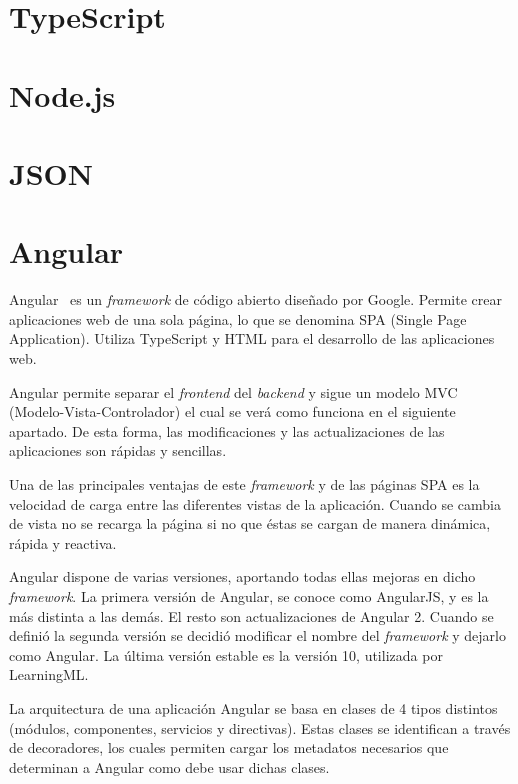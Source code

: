\documentclass[a4paper, 12pt]{book}
\begin{document}
\section{TypeScript} 
\label{sec:typescript}

\section{Node.js} 
\label{sec:nodejs}

\section{JSON} 
\label{sec:json}

\section{Angular} 
\label{sec:angular}

Angular~\cite{angular} es un \emph{framework} de código abierto diseñado por Google. Permite crear aplicaciones web de una sola página, lo que se denomina SPA (Single Page Application). Utiliza TypeScript y HTML para el desarrollo de las aplicaciones web. 

Angular permite separar el \emph{frontend} del \emph{backend} y sigue un modelo MVC (Modelo-Vista-Controlador) el cual se verá como funciona en el siguiente apartado. De esta forma, las modificaciones y las actualizaciones de las aplicaciones son rápidas y sencillas. 

Una de las principales ventajas de este \emph{framework} y de las páginas SPA es la velocidad de carga entre las diferentes vistas de la aplicación. Cuando se cambia de vista no se recarga la página si no que éstas se cargan de manera dinámica, rápida y reactiva. 

Angular dispone de varias versiones, aportando todas ellas mejoras en dicho \emph{framework}. La primera versión de Angular, se conoce como AngularJS, y es la más distinta a las demás. El resto son actualizaciones de Angular 2. Cuando se definió la segunda versión se decidió modificar el nombre del \emph{framework} y dejarlo como Angular. La última versión estable es la versión 10, utilizada por LearningML.

La arquitectura de una aplicación Angular se basa en clases de 4 tipos distintos (módulos, componentes, servicios y directivas). Estas clases se identifican a través de decoradores, los cuales permiten cargar los metadatos necesarios que determinan a Angular como debe usar dichas clases.
\end{document}
